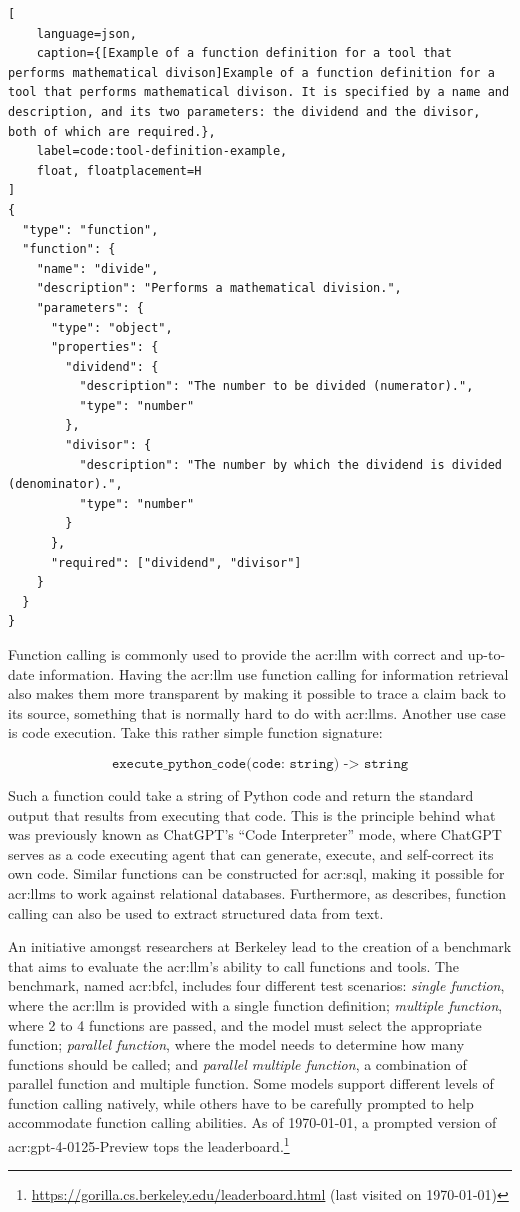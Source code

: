 \begin{lstlisting}[
    language=json,
    caption={[Example of a function definition for a tool that performs mathematical divison]Example of a function definition for a tool that performs mathematical divison. It is specified by a name and description, and its two parameters: the dividend and the divisor, both of which are required.},
    label=code:tool-definition-example,
    float, floatplacement=H
]
{
  "type": "function",
  "function": {
    "name": "divide",
    "description": "Performs a mathematical division.",
    "parameters": {
      "type": "object",
      "properties": {
        "dividend": {
          "description": "The number to be divided (numerator).",
          "type": "number"
        },
        "divisor": {
          "description": "The number by which the dividend is divided (denominator).",
          "type": "number"
        }
      },
      "required": ["dividend", "divisor"]
    }
  }
}
\end{lstlisting}

Function calling is commonly used to provide the \acrshort{acr:llm} with correct and up-to-date information. Having the \gls{acr:llm} use function calling for information retrieval also makes them more transparent by making it possible to trace a claim back to its source, something that is normally hard to do with \glspl{acr:llm}. Another use case is code execution. Take this rather simple function signature:

$$
    \texttt{execute\_python\_code(code: string) -> string}
$$

Such a function could take a string of Python code and return the standard output that results from executing that code. This is the principle behind what was previously known as ChatGPT's \enquote{Code Interpreter} mode, where ChatGPT serves as a code executing agent that can generate, execute, and self-correct its own code. Similar functions can be constructed for \acrshort{acr:sql}, making it possible for \glspl{acr:llm} to work against relational databases. Furthermore, as \cite{eletiFunctionCallingOther2023} describes, function calling can also be used to extract structured data from text.

An initiative amongst researchers at Berkeley \citep{yanfanjiaBerkeleyFunctionCalling2024} lead to the creation of a benchmark that aims to evaluate the \acrshort{acr:llm}'s ability to call functions and tools. The benchmark, named \gls{acr:bfcl}, includes four different test scenarios: \textit{single function}, where the \acrshort{acr:llm} is provided with a single function definition; \textit{multiple function}, where 2 to 4 functions are passed, and the model must select the appropriate function; \textit{parallel function}, where the model needs to determine how many functions should be called; and \textit{parallel multiple function}, a combination of parallel function and multiple function. Some models support different levels of function calling natively, while others have to be carefully prompted to help accommodate function calling abilities. As of \today, a prompted version of \acrshort{acr:gpt}-4-0125-Preview tops the leaderboard.\footnote{\url{https://gorilla.cs.berkeley.edu/leaderboard.html} (last visited on \today)}

